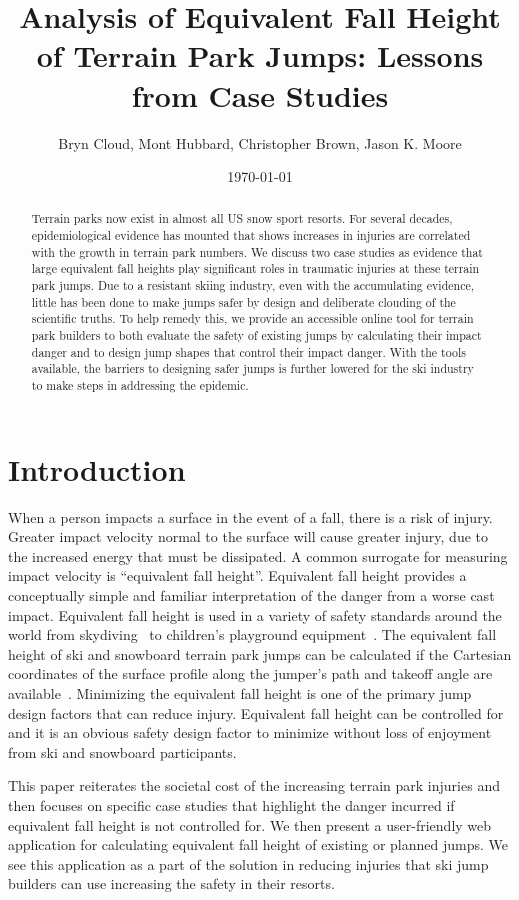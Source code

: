 \documentclass{article}
\title{Analysis of Equivalent Fall Height of Terrain Park Jumps: Lessons from
  Case Studies}
\author{Bryn Cloud, Mont Hubbard, Christopher Brown, Jason K. Moore}
\date{\today}
\begin{document}
\maketitle

\begin{abstract}
  Terrain parks now exist in almost all US snow sport resorts. For several decades,
  epidemiological evidence has mounted that shows increases in injuries are
  correlated with the growth in terrain park numbers. We discuss two case studies
  as evidence that large equivalent fall heights play significant roles
  in traumatic injuries at these terrain park jumps. Due to a resistant skiing industry, even with the accumulating evidence, little has been done to make jumps safer by design and deliberate clouding of the scientific truths. To help remedy
  this, we provide an accessible online tool for terrain park builders to
  both evaluate the safety of existing jumps by calculating their impact danger and to design jump shapes that control
  their impact danger. With the tools available, the barriers to designing safer
  jumps is further lowered for the ski industry to make steps in addressing the
  epidemic.
\end{abstract}

\section{Introduction}
%
When a person impacts a surface in the event of a fall, there is a risk of
injury. Greater impact velocity normal to the surface will cause greater
injury, due to the increased energy that must be dissipated. A common surrogate
for measuring impact velocity is ``equivalent fall height''.  Equivalent fall
height provides a conceptually simple and familiar interpretation of the danger
from a worse cast impact. Equivalent fall height is used in a variety of safety
standards around the world from skydiving~ to children's
playground equipment~\cite{Chalmers1996}. The equivalent fall height of ski and
snowboard terrain park jumps can be calculated if the Cartesian coordinates of
the surface profile along the jumper's path and takeoff angle are
available~\cite{Hubbard2012}. Minimizing the equivalent fall height is one of
the primary jump design factors that can reduce injury. Equivalent fall height
can be controlled for and it is an obvious safety design factor to minimize
without loss of enjoyment from ski and snowboard participants.

This paper reiterates the societal cost of the increasing terrain park injuries
and then focuses on specific case studies that highlight the danger incurred if
equivalent fall height is not controlled for. We then present a user-friendly
web application for calculating equivalent fall height of existing or planned
jumps. We see this application as a part of the solution in reducing injuries
that ski jump builders can use increasing the safety in their resorts.
\end{document}
